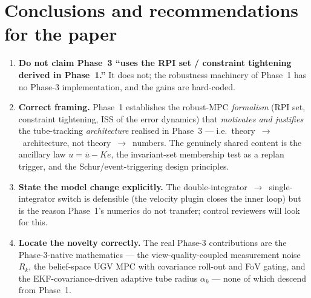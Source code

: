 \documentclass[11pt]{article}
\begin{document}
\section{Conclusions and recommendations for the paper}
\begin{enumerate}[leftmargin=1.4em]
\item \textbf{Do not claim Phase~3 ``uses the RPI set / constraint tightening derived in Phase~1.''}
It does not; the robustness machinery of Phase~1 has no Phase-3 implementation, and the gains are
hard-coded.
\item \textbf{Correct framing.} Phase~1 establishes the robust-MPC \emph{formalism} (RPI set,
constraint tightening, ISS of the error dynamics) that \emph{motivates and justifies} the
tube-tracking \emph{architecture} realised in Phase~3 --- i.e.\ theory~$\rightarrow$~architecture,
not theory~$\rightarrow$~numbers. The genuinely shared content is the ancillary law $u=\bar u-Ke$,
the invariant-set membership test as a replan trigger, and the Schur/event-triggering design
principles.
\item \textbf{State the model change explicitly.} The double-integrator~$\to$~single-integrator
switch is defensible (the velocity plugin closes the inner loop) but is the reason Phase~1's
numerics do not transfer; control reviewers will look for this.
\item \textbf{Locate the novelty correctly.} The real Phase-3 contributions are the Phase-3-native
mathematics --- the view-quality-coupled measurement noise $R_k$, the belief-space UGV MPC with
covariance roll-out and FoV gating, and the EKF-covariance-driven adaptive tube radius $\alpha_k$
--- none of which descend from Phase~1.
\end{enumerate}
\end{document}
